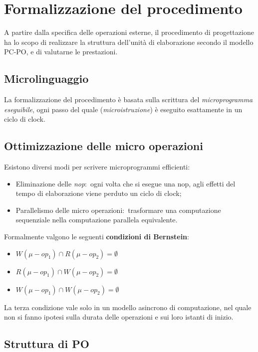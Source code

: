 \section{Formalizzazione del procedimento}

A partire dalla specifica delle operazioni esterne, il procedimento di progettazione ha lo scopo di realizzare la struttura dell'unità di elaborazione secondo il modello PC-PO, e di valutarne le prestazioni.

\subsection{Microlinguaggio}

La formalizzazione del procedimento è basata sulla scrittura del \textit{microprogramma eseguibile}, ogni passo del quale (\textit{microistruzione}) è eseguito esattamente in un ciclo di clock.

\subsection{Ottimizzazione delle micro operazioni}

Esistono diversi modi per scrivere microprogrammi efficienti:

\begin{itemize}
    \item Eliminazione delle \textit{nop}:\ ogni volta che si esegue una nop, agli effetti del tempo di elaborazione viene perduto un ciclo di clock;
    \item Parallelismo delle micro operazioni:\ trasformare una computazione sequenziale nella computazione parallela equivalente.
\end{itemize}

\noindent Formalmente valgono le seguenti \textbf{condizioni di Bernstein}:

\begin{itemize}
    \item $W(\mu-op_1) \cap R(\mu-op_2) = \emptyset $
    \item $R(\mu-op_1) \cap W(\mu-op_2) = \emptyset $
    \item $W(\mu-op_1) \cap W(\mu-op_2) = \emptyset $
\end{itemize}

La terza condizione vale solo in un modello asincrono di computazione, nel quale non si fanno ipotesi sulla durata delle operazioni e sui loro istanti di inizio.

\subsection{Struttura di PO}


